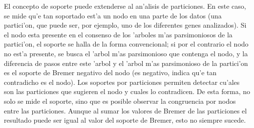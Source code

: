 El concepto de soporte puede extenderse al an'alisis de particiones. En este caso, se mide qu'e tan soportado est'a un nodo en una parte de los datos (una partici'on, que puede ser, por ejemplo, uno de los diferentes genes analizados). Si el nodo esta presente en el consenso de los 'arboles m'as parsimoniosos de la partici'on, el soporte se halla de la forma convencional; si por el contrario el nodo no est'a presente, se busca el 'arbol m'as parsimonioso que contenga el nodo, y la diferencia de pasos entre este 'arbol y el 'arbol m'as parsimonioso de la partici'on es el soporte de Bremer negativo del nodo (es negativo, indica qu'e tan contradicho es el nodo). Los soportes por particiones permiten detectar cu'ales son las particiones que sugieren el nodo y cuales lo contradicen. De esta forma, no solo se mide el soporte, sino que es posible observar la congruencia por nodos entre las particiones. Aunque al sumar los valores de Bremer de las particiones el resultado puede ser igual al valor del soporte de Bremer, esto no siempre sucede.

